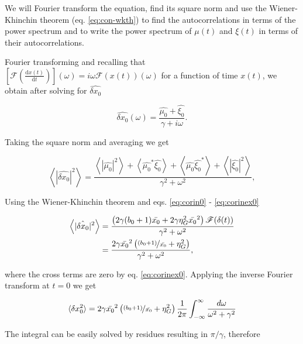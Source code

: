 We will Fourier transform the equation, find its square norm and use the Wiener-Khinchin theorem (eq. \eqref{eq:con-wkth}) to find the autocorrelations in terms of the power spectrum and to write the power spectrum of $\mu(t)$ and $\xi(t)$ in terms of their autocorrelations.

Fourier transforming and recalling that $[\mathscr{F}(\frac{\mathrm{d}x(t)}{\mathrm{d}t})](\omega) = i\omega \mathscr{F}(x(t))(\omega)$ for a function of time $x(t)$, we obtain after solving for $\hat{\delta x_0}$

\begin{equation}
\label{eq:fgene0}
\hat{\delta x_0}(\omega) = \frac{\hat{\mu_0}+\hat{\xi_0}}{\gamma + i\omega}.
\end{equation}

Taking the square norm and averaging we get

\begin{equation}
\left\langle |\hat{\delta x_0}|^2 \right\rangle = \frac{\left\langle|\hat{\mu_0}|^2\right\rangle + \left\langle\hat{\mu_0}^*\hat{\xi_0}\right\rangle+\left\langle\hat{\mu_0}\hat{\xi_0}^*\right\rangle+\left\langle|\hat{\xi_0}|^2\right\rangle}{\gamma^2 + \omega^2},
\end{equation}

Using the Wiener-Khinchin theorem and eqs. \eqref{eq:corin0} - \eqref{eq:corinex0}

\begin{equation}
  \label{eq:pgene0}
  \begin{split}
    \left\langle |\hat{\delta x_0}|^2 \right\rangle &= \frac{\left(2\gamma(b_0+1)\bar{x_0}+ 2\gamma\eta_G^2\bar{x_0}^2\right)\mathscr{F}(\delta(t))}{\gamma^2+\omega^2}\\
    &=\frac{2\gamma\bar{x_0}^2\left(\nicefrac{(b_0+1)}{\bar{x_0}}+ \eta_G^2\right)}{\gamma^2+\omega^2},
  \end{split}
\end{equation}

where the cross terms are zero by eq. \eqref{eq:corinex0}. Applying the inverse Fourier transform at $t=0$ we get

\begin{equation*}
\langle \delta x_0^2 \rangle = 2\gamma\bar{x_0}^2\left(\nicefrac{(b_0+1)}{\bar{x_0}}+ \eta_G^2\right)\frac{1}{2\pi}\int_{-\infty}^{\infty}\frac{d\omega}{\omega^2+\gamma^2}
\end{equation*}

The integral can be easily solved by residues resulting in $\pi/\gamma$, therefore

